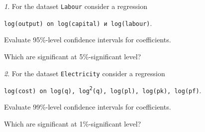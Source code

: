 \documentclass[12pt]{article}
\theoremstyle{remark}
\newtheorem{problem}{}[section]
\begin{document}
\begin{problem}
For the dataset \texttt{Labour} consider a regression
\begin{center}
	\texttt{log(output) on log(capital) и log(labour)}.
\end{center}
Evaluate 95\%-level confidence intervals for coefficients.

Which are significant at 5\%-significant level?
\end{problem}

\begin{problem}
For the dataset \texttt{Electricity} consider a regression
\begin{center}
	\texttt{log(cost) on log(q), log\textsuperscript{2}(q), log(pl), log(pk), log(pf)}.
\end{center}
Evaluate 99\%-level confidence intervals for coefficients.

Which are significant at 1\%-significant level?
\end{problem}
\end{document}
